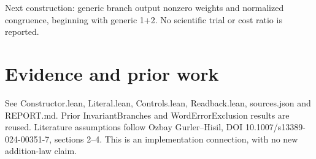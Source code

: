 \documentclass[11pt]{article}
\begin{document}
Next construction: generic branch output nonzero weights and normalized congruence, beginning with generic 1+2. No scientific trial or cost ratio is reported.
\section*{Evidence and prior work}
See Constructor.lean, Literal.lean, Controls.lean, Readback.lean, sources.json and REPORT.md. Prior InvariantBranches and WordErrorExclusion results are reused. Literature assumptions follow Ozbay Gurler--Hisil, DOI 10.1007/s13389-024-00351-7, sections 2--4. This is an implementation connection, with no new addition-law claim.
\end{document}
